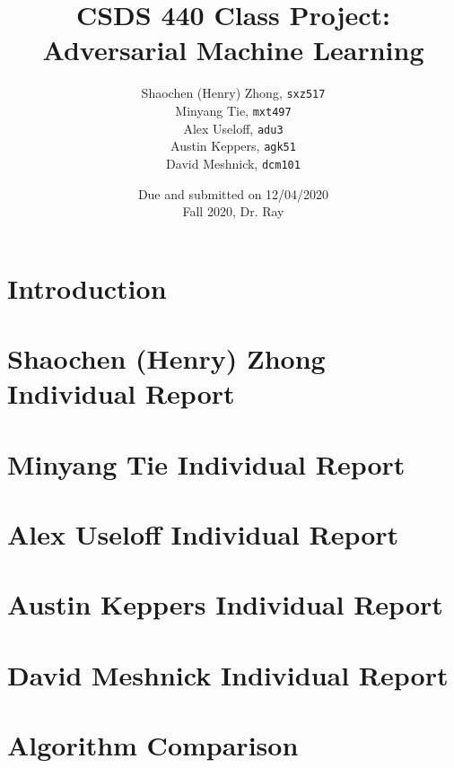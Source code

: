 \documentclass[11pt]{article}
\newcommand{\ilcode}{\texttt}
\begin{document}
\title{\textbf{CSDS 440 Class Project: \\Adversarial Machine Learning}}

\author{Shaochen (Henry) Zhong, \ilcode{sxz517} \\ Minyang Tie, \ilcode{mxt497} \\ Alex Useloff, \ilcode{adu3} \\ Austin Keppers, \ilcode{agk51} \\ David Meshnick, \ilcode{dcm101}\\}
\date{Due and submitted on 12/04/2020 \\ Fall 2020, Dr. Ray}
\maketitle

\section{Introduction}

\section{Shaochen (Henry) Zhong Individual Report}


\section{Minyang Tie Individual Report}


\section{Alex Useloff Individual Report}


\section{Austin Keppers Individual Report}


\section{David Meshnick Individual Report}

\section{Algorithm Comparison}
\end{document}

